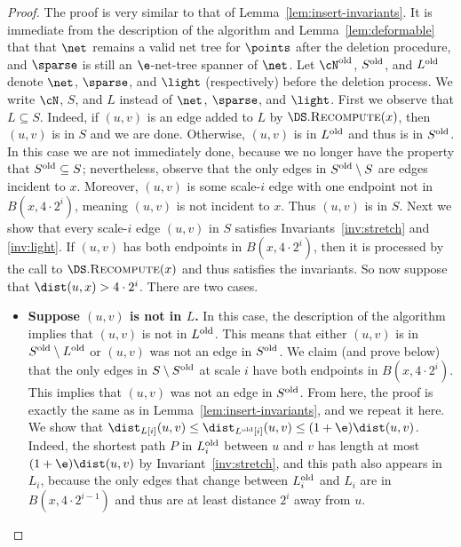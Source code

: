 \begin{proof}
The proof is very similar to that of Lemma~\ref{lem:insert-invariants}.
    It is immediate from the description of the algorithm and Lemma~\ref{lem:deformable} that that $\net$ remains a valid net tree for $\points$ after the deletion procedure, and $\sparse$ is still an $\e$-net-tree spanner of $\net$. Let $\cN^{\rm old}$, $S^{\rm old}$, and $L^{\rm old}$ denote $\net$, $\sparse$, and $\light$ (respectively) before the deletion process. We write $\cN$, $S$, and $L$ instead of $\net$, $\sparse$, and $\light$.
%
%
    First we observe that $L \subseteq S$. Indeed, if $(u,v)$ is an edge added to $L$ by $\DS.\textsc{Recompute}(x)$, then $(u,v)$ is in $S$ and we are done. Otherwise, $(u,v)$ is in $L^{\rm old}$ and thus is in $S^{\rm old}$. In this case we are not immediately done, because we no longer have the property that $S^{\rm old} \subseteq S$; nevertheless, observe that the only edges in $S^{\rm old} \setminus S$ are edges incident to $x$. Moreover, $(u,v)$ is some scale-$i$ edge with one endpoint not in $B(x, 4 \cdot 2^i)$,
    meaning $(u,v)$ is not incident to $x$. Thus $(u,v)$ is in $S$.
%
    Next we show that every scale-$i$ edge $(u,v)$ in $S$ satisfies Invariants~\ref{inv:stretch} and \ref{inv:light}. If $(u,v)$ has both endpoints in $B(x, 4 \cdot 2^i)$, then it is processed by the call to $\DS.\textsc{Recompute}(x)$ and thus satisfies the invariants. So now suppose that $\dist(u, x) > 4 \cdot 2^i$. There are two cases.
    \begin{itemize}
        \item \textbf{\boldmath Suppose $(u,v)$ is not in $L$.} In this case, the description of the algorithm implies that $(u,v)$ is not in $L^{\rm old}$. This means that either $(u,v)$ is in $S^{\rm old} \setminus L^{\rm old}$ or $(u,v)$ was not an edge in $S^{\rm old}$. We claim (and prove below) that the only edges in $S \setminus S^{\rm old}$ at scale $i$ have both endpoints in $B(x, 4 \cdot 2^i)$. This implies that $(u,v)$ was not an edge in $S^{\rm old}$.
        From here, the proof is exactly the same as in Lemma~\ref{lem:insert-invariants}, and we repeat it here. We show that $\dist_{L[i]}(u,v) \le \dist_{L^{\rm old}[i]}(u,v) \le (1+\e) \dist(u,v)$. Indeed, the shortest path $P$ in $L_i^{\rm old}$ between $u$ and $v$ has length at most $(1+\e) \dist(u,v)$ by Invariant~\ref{inv:stretch}, and this path also appears in $L_i$, because the only edges that change between $L_i^{\rm old}$ and $L_i$ are in $B(x, 4 \cdot 2^{i-1})$ and thus are at least distance $2^i$ away from $u$.

\end{itemize}
\end{proof}
